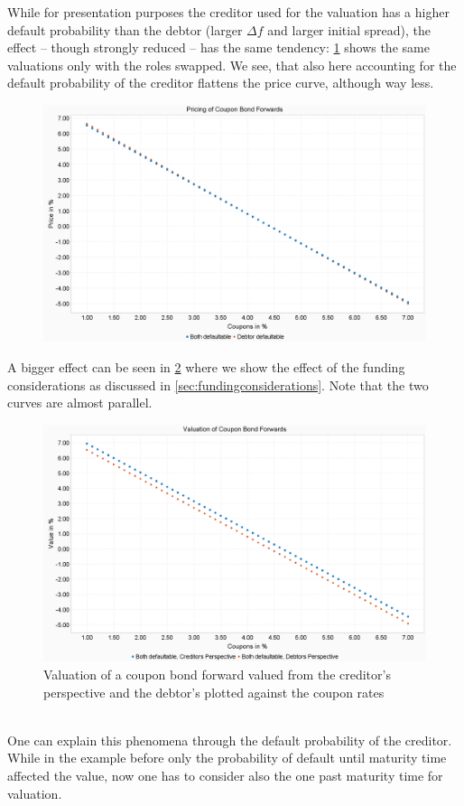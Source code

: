 \documentclass[12pt]{article}
\begin{document}
	While for presentation purposes the creditor used for the valuation has a higher default probability than the debtor (larger $\Delta f$ and larger initial spread), the effect -- though strongly reduced -- has the same tendency: \cref{fig:valuationcouponbondforwardbycouponsrightcred} shows the same valuations only with the roles swapped. We see, that also here accounting for the default probability of the creditor flattens the price curve, although way less.
	\begin{figure}[!h]
		\centering
		\includegraphics[width=0.7\linewidth]{figures/Today/ValuationCouponBondForward_byCoupons_RightCred}
		\caption{}
		\label{fig:valuationcouponbondforwardbycouponsrightcred}
	\end{figure}	
	A bigger effect can be seen in \cref{fig:valuationcouponbondforwardbycoupons} where we show the effect of the funding considerations as discussed in \cref{sec:fundingconsiderations}. Note that the two curves are almost parallel.
	\begin{figure}[!h]
		\centering
		\includegraphics[width=0.7\linewidth]{figures/Today/ValuationCouponBondForward_byCoupons}
		\caption{Valuation of a coupon bond forward valued from the creditor's perspective and the debtor's plotted against the coupon rates}
		\label{fig:valuationcouponbondforwardbycoupons}
	\end{figure}
	\\One can explain this phenomena through the default probability of the creditor. While in the example before only the probability of default until maturity time affected the value, now one has to consider also the one past maturity time for valuation.
		
\end{document}
